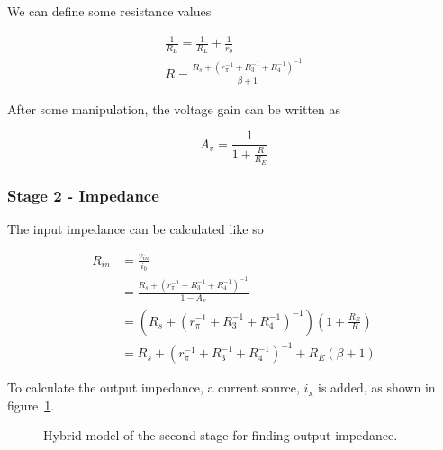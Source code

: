\documentclass[a4paper,11pt]{article}
\begin{document}
            We can define some resistance values
            
            \begin{subequations} \label{eq:stage2res}
            \begin{gather}
                \frac{1}{R_E} = \frac{1}{R_L} + \frac{1}{r_o} \\
                R = \frac{R_s + \left( r_{\pi}^{-1} + R_{3}^{-1} + R_{4}^{-1} \right)^{-1}}{\beta + 1}
            \end{gather}
            \end{subequations}
            
            After some manipulation, the voltage gain can be written as
            
            \begin{equation} \label{eq:stage2gain}
                A_v = \frac{1}{1 + \frac{R}{R_E}}
            \end{equation}
            
        \subsubsection{Stage 2 - Impedance}
        
            The input impedance can be calculated like so~\cite{wikiCC}
            
            \begin{subequations}
            \begin{align}
                R_{in} &= \frac{v_{in}}{i_b} \\
                       &= \frac{R_s + \left( r_{\pi}^{-1} + R_{3}^{-1} + R_{4}^{-1} \right)^{-1}}{1 - A_v} \\
                       &= \left( R_s + \left( r_{\pi}^{-1} + R_{3}^{-1} + R_{4}^{-1} \right)^{-1} \right) \left( 1 + \frac{R_E}{R} \right) \\
                       &= R_s + \left( r_{\pi}^{-1} + R_{3}^{-1} + R_{4}^{-1} \right)^{-1} + R_E (\beta + 1)
            \end{align}
            \end{subequations}
            
            To calculate the output impedance, a current source, $i_\mathrm{x}$ is added, as shown in figure~\ref{fig:stage2hpi2}.
            
            \begin{figure}[h]
            \centering
                
                \caption{Hybrid-\textpi model of the second stage for finding output impedance.}
                \label{fig:stage2hpi2}
            \end{figure}
            
\end{document}
